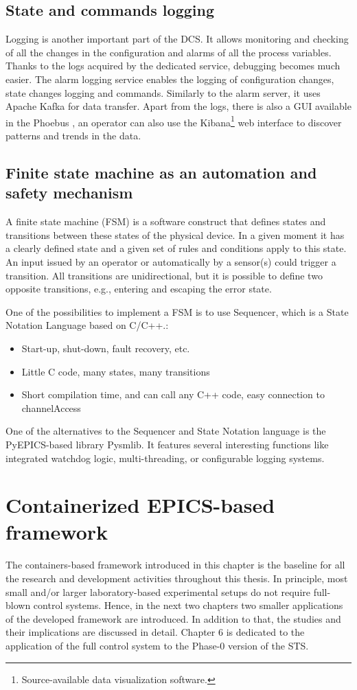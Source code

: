 \subsection{State and commands logging}
Logging is another important part of the \gls{DCS}. It allows monitoring and checking of all the changes in the configuration and alarms of all the process variables. Thanks to the logs acquired by the dedicated service, debugging becomes much easier. The alarm logging service enables the logging of configuration changes, state changes logging and commands. Similarly to the alarm server, it uses Apache Kafka for data transfer. Apart from the logs, there is also a \gls{GUI} available in the Phoebus \cite{alarm_logger}, an operator can also use the Kibana\footnote{Source-available data visualization software.} web interface to discover patterns and trends in the data. 

\subsection{Finite state machine as an automation and safety mechanism}
A finite state machine (\gls{FSM}) is a software construct that defines states and transitions between these states of the physical device. In a given moment it has a clearly defined state and a given set of rules and conditions apply to this state. An input issued by an operator or automatically by a sensor(s) could trigger a transition. All transitions are unidirectional, but it is possible to define two opposite transitions, e.g., entering and escaping the error state. 

One of the possibilities to implement a \gls{FSM} is to use Sequencer, which is a State Notation Language based on C/C++.:
\begin{itemize}
    \item Start-up, shut-down, fault recovery, etc.
    \item Little C code, many states, many transitions
    \item Short compilation time, and can call any C++ code, easy connection to channelAccess
\end{itemize}

One of the alternatives to the Sequencer and State Notation language is the PyEPICS-based library Pysmlib\cite{pysmlib}. It features several interesting functions like integrated watchdog logic, multi-threading, or configurable logging systems.


\section{Containerized EPICS-based framework}

The containers-based framework introduced in this chapter is the baseline for all the research and development activities throughout this thesis. In principle, most small and/or larger laboratory-based experimental setups do not require full-blown control systems. Hence, in the next two chapters two smaller applications of the developed framework are introduced. In addition to that, the studies and their implications are discussed in detail. Chapter 6 is dedicated to the application of the full control system to the Phase-0 version of the \gls{STS}.